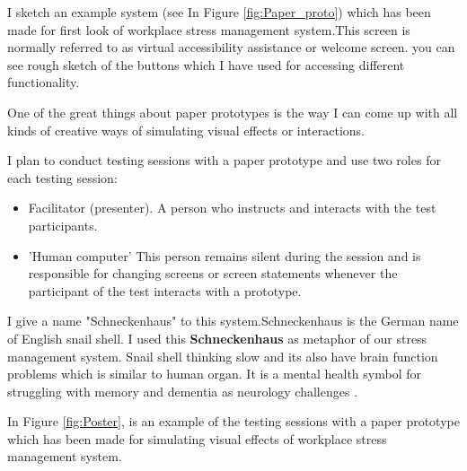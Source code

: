 I sketch an example system (see In Figure \ref{fig:Paper_proto})  which has been made for first look of workplace stress management system.This screen is normally referred to as virtual accessibility assistance or welcome screen. you can see rough sketch of the buttons which I have used for accessing different functionality. 

One of the great things about paper prototypes is the way I can come up with all kinds of creative ways of simulating visual effects or interactions.

I plan to conduct testing sessions with a paper prototype and use two roles for each testing session:
\begin{itemize}
    \item Facilitator (presenter). A person who instructs and interacts with the test participants.
    \item 'Human computer' This person remains silent during the session and is responsible for changing screens or screen statements whenever the participant of the test interacts with a prototype.
\end{itemize}

I give a name "Schneckenhaus" to this system.Schneckenhaus is the German name of English snail shell. I used this \textbf{Schneckenhaus} as metaphor of our stress management system. Snail shell thinking slow and its also have brain function problems which is similar to human organ. It is a mental health symbol for struggling with memory and dementia as neurology challenges \citep{Zachos2018TraumaResearch}.

In Figure \ref{fig:Poster}, is an example of the testing sessions with a paper prototype which has been made for simulating visual effects of workplace stress management system.

